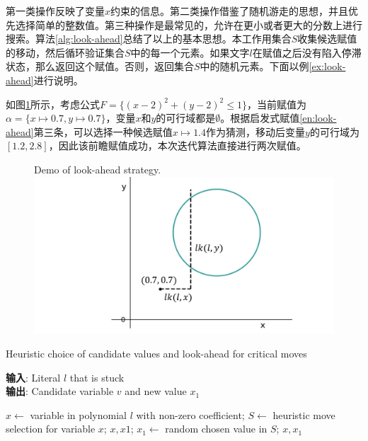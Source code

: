 第一类操作反映了变量$x$约束的信息。第二类操作借鉴了随机游走的思想，并且优先选择简单的整数值。第三种操作是最常见的，允许在更小或者更大的分数上进行搜索。算法\ref{alg:look-ahead}总结了以上的基本思想。本工作用集合$S$收集候选赋值的移动，然后循环验证集合$S$中的每一个元素。如果文字$l$在赋值之后没有陷入停滞状态，那么返回这个赋值。否则，返回集合$S$中的随机元素。下面以例\ref{ex:look-ahead}进行说明。

\begin{example}
如图\ref{fig:look-ahead}所示，考虑公式$F = \{(x - 2)^2 + (y - 2)^2 \leq 1\}$，当前赋值为$\alpha = \{x \mapsto 0.7, y \mapsto 0.7\}$，变量$x$和$y$的可行域都是$\emptyset$。根据启发式赋值\ref{en:look-ahead}第三条，可以选择一种候选赋值$x \mapsto 1.4$作为猜测，移动后变量$y$的可行域为$[1.2, 2.8]$，因此该前瞻赋值成功，本次迭代算法直接进行两次赋值。

\begin{figure}[t]
    \centering
     {Demo of look-ahead strategy.}
    \includegraphics[width=0.7\columnwidth]{Img/look-ahead.png}
\label{fig:look-ahead}
\end{figure}
\label{ex:look-ahead}
\end{example}

\begin{algorithm}[t]
    \caption{Heuristic choice of candidate values and look-ahead for critical moves}
    \label{alg:look-ahead}
    \textbf{输入}: Literal $l$ that is stuck\\
    \textbf{输出}: Candidate variable $v$ and new value $x_1$
    
    \begin{algorithmic}[1] %
        \Statex \hrulefill
        \STATE $x \leftarrow$ variable in polynomial  $l$ with non-zero coefficient;
        \STATE $S \leftarrow$ heuristic move selection for variable $x$;
                \RETURN $x, x1$;
            \ENDIF
        \ENDFOR
        \STATE $x_1 \leftarrow$ random chosen value in $S$;
        \STATE \RETURN $x, x_1$
    \end{algorithmic}
\end{algorithm}

